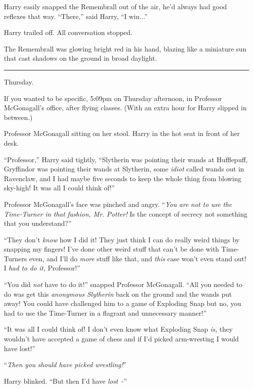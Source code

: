Harry easily snapped the Remembrall out of the air, he'd always had good reflexes that way. ``There,'' said Harry, ``I win...''

Harry trailed off. All conversation stopped.

The Remembrall was glowing bright red in his hand, blazing like a miniature sun that cast shadows on the ground in broad daylight.

\begin{center}\rule{3in}{0.4pt}\end{center}

Thursday.

If you wanted to be specific, 5:09pm on Thursday afternoon, in Professor McGonagall's office, after flying classes. (With an extra hour for Harry slipped in between.)

Professor McGonagall sitting on her stool. Harry in the hot seat in front of her desk.

``Professor,'' Harry said tightly, ``Slytherin was pointing their wands at Hufflepuff, Gryffindor was pointing their wands at Slytherin, some \emph{idiot} called wands out in Ravenclaw, and I had maybe five seconds to keep the whole thing from blowing sky-high! It was all I could think of!''

Professor McGonagall's face was pinched and angry. ``\emph{You are not to use the Time-Turner in that fashion, Mr. Potter!} Is the concept of secrecy not something that you understand?''

``They don't \emph{know} how I did it! They just think I can do really weird things by snapping my fingers! I've done other weird stuff that can't be done with Time-Turners even, and I'll do \emph{more} stuff like that, and \emph{this} case won't even stand out! I \emph{had to do it,} Professor!''

``You did \emph{not} have to do it!'' snapped Professor McGonagall. ``All you needed to do was get this \emph{anonymous Slytherin} back on the ground and the wands put away! You could have challenged him to a game of Exploding Snap but no, you had to use the Time-Turner in a flagrant and unnecessary manner!''

``It was all I could think of! I don't even know what Exploding Snap \emph{is,} they wouldn't have accepted a game of chess and if I'd picked arm-wresting I would have lost!''

``\emph{Then you should have picked wrestling!}''

Harry blinked. ``But then I'd have \emph{lost}~-''

